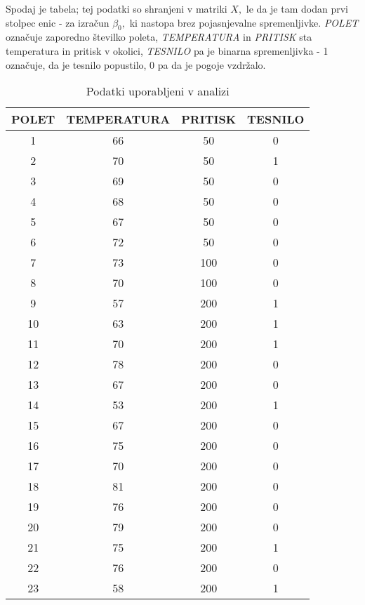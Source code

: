 \documentclass[12pt,a4paper]{amsart}
\theoremstyle{definition} %
\theoremstyle{plain} %
\begin{document}
Spodaj je tabela; tej podatki so shranjeni v matriki $X,$ le da je tam dodan prvi stolpec enic - za izračun $\beta_{0},$ ki nastopa brez pojasnjevalne spremenljivke.
\textit{POLET} označuje zaporedno številko poleta, \textit{TEMPERATURA} in \textit{PRITISK} sta temperatura in pritisk v okolici, \textit{TESNILO} pa je binarna
spremenljivka - 1 označuje, da je tesnilo popustilo, 0 pa da je pogoje vzdržalo.
\begin{center}
\begin{table}[H]
    \begin{tabular}{| c | c | c | c |}
        \hline
        POLET & TEMPERATURA & PRITISK & TESNILO \\
        \hline
        1&66&50&0\\
        2&70&50&1\\
        3&69&50&0\\
        4&68&50&0\\
        5&67&50&0\\
        6&72&50&0\\
        7&73&100&0\\
        8&70&100&0\\
        9&57&200&1\\
        10&63&200&1\\
        11&70&200&1\\
        12&78&200&0\\
        13&67&200&0\\
        14&53&200&1\\
        15&67&200&0\\
        16&75&200&0\\
        17&70&200&0\\
        18&81&200&0\\
        19&76&200&0\\
        20&79&200&0\\
        21&75&200&1\\
        22&76&200&0\\
        23&58&200&1\\
        \hline
\end{tabular}
\caption{\label{podatki} Podatki uporabljeni v analizi}
\end{table}
\end{center}
\end{document}
